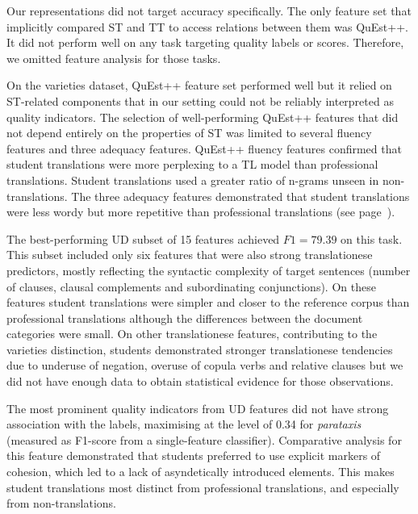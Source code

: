 Our representations did not target accuracy specifically. The only feature set that implicitly compared ST and TT to access relations between them was QuEst++. It did not perform well on any task targeting quality labels or scores. Therefore, we omitted feature analysis for those tasks.

On the varieties dataset, QuEst++ feature set performed well but it relied on ST-related components that in our setting could not be reliably interpreted as quality indicators. 
The selection of well-performing QuEst++ features that did not depend entirely on the properties of ST was limited to several fluency features and three adequacy features. QuEst++ fluency features confirmed that student translations were more perplexing to a TL model than professional translations. Student translations used a greater ratio of n-grams unseen in non-translations. The three adequacy features demonstrated that student translations were less wordy but more repetitive than professional translations (see page~\pageref{pg:quest_adequacy_feats_for_vars}).

The best-performing UD subset of 15 features achieved $F1=79.39$ on this task. This subset included only six features that were also strong translationese predictors, mostly reflecting the syntactic complexity of target sentences (number of clauses, clausal complements and subordinating conjunctions). On these features student translations were simpler and closer to the reference corpus than professional translations although the differences between the document categories were small. On other translationese features, contributing to the varieties distinction, students demonstrated stronger translationese tendencies due to underuse of negation, overuse of copula verbs and relative clauses but we did not have enough data to obtain statistical evidence for those observations. 

The most prominent quality indicators from UD features did not have strong association with the labels, maximising at the level of 0.34 for \textit{parataxis} (measured as F1-score from a single-feature classifier). Comparative analysis for this feature demonstrated that students preferred to use explicit markers of cohesion, which led to a lack of asyndetically introduced elements. This makes student translations most distinct from professional translations, and especially from non-translations.

